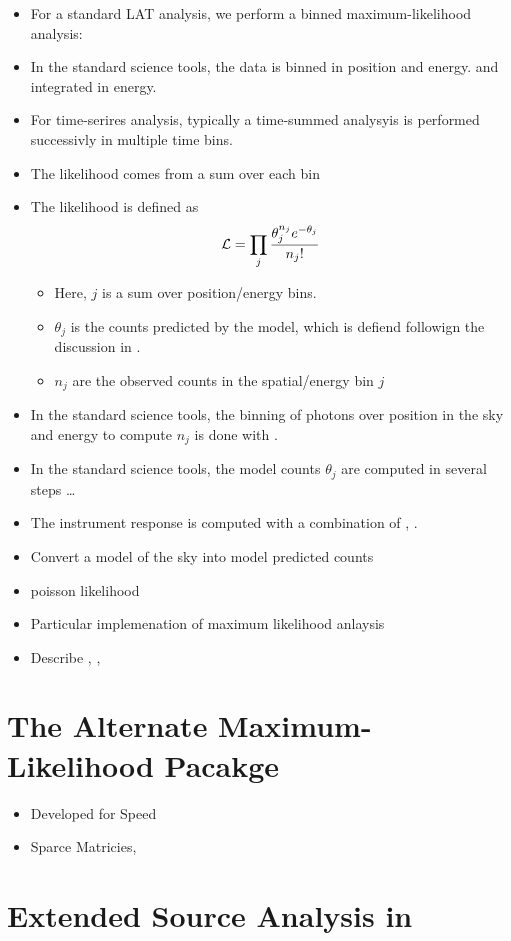 \begin{itemize}
  \item For a standard LAT analysis, we perform a binned maximum-likelihood analysis:
  \item In the standard science tools, the data is binned in position and energy.
    and integrated in energy.
  \item For time-serires analysis, typically a time-summed analysyis is performed successivly in
    multiple time bins.
  \item The likelihood comes from a sum over each bin
  \item The likelihood is defined as
    \begin{equation}
      \mathcal{L}=\prod_j \frac{\theta_j^{n_j} e^{-\theta_j}}{n_j!}
    \end{equation}
    \begin{itemize}
      \item Here, $j$ is a sum over position/energy bins.
      \item $\theta_j$ is the counts predicted by the model, which
        is defiend followign the discussion in .
      \item $n_j$ are the observed counts in the spatial/energy bin $j$
    \end{itemize}
  \item In the standard \fermi science tools, 
    the binning of photons over position in the sky and energy to compute $n_j$ 
    is done with \gtbin.
  \item In the standard \fermi science tools, the 
    model counts $\theta_j$ are computed in several steps \ldots

  \item The instrument response is computed with a combination of \gtltcube,
    \gtexpcube.

  \item Convert a model of the sky into model predicted counts
  \item poisson likelihood
  \item Particular implemenation of maximum likelihood anlaysis
  \item Describe \gtbin, \gtselect, \gtlike
\end{itemize}




\section{The Alternate Maximum-Likelihood Pacakge \pointlike}

\begin{itemize}
\item Developed for Speed
\item Sparce Matricies, 
\end{itemize}

\section{Extended Source Analysis in \pointlike}
